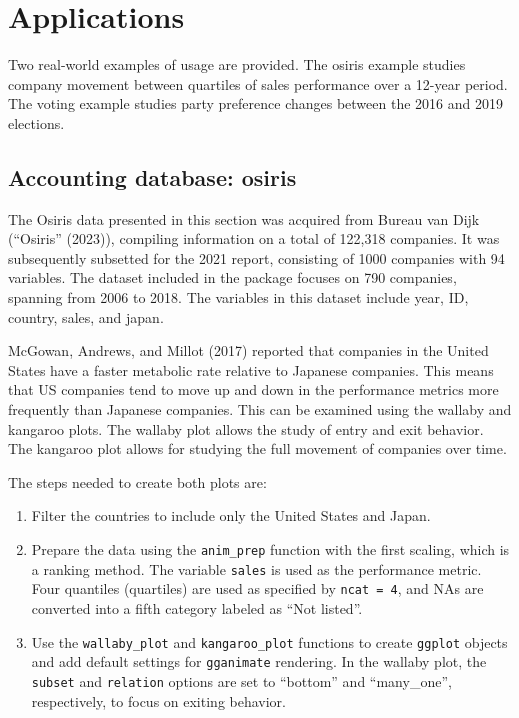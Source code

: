 \hypertarget{applications}{%
\section{Applications}\label{applications}}

Two real-world examples of usage are provided. The osiris example studies company movement between quartiles of sales performance over a 12-year period. The voting example studies party preference changes between the 2016 and 2019 elections.

\hypertarget{accounting-database-osiris}{%
\subsection{Accounting database: osiris}\label{accounting-database-osiris}}

The Osiris data presented in this section was acquired from Bureau van Dijk ({``Osiris''} (2023)), compiling information on a total of 122,318 companies. It was subsequently subsetted for the 2021 report, consisting of 1000 companies with 94 variables. The dataset included in the package focuses on 790 companies, spanning from 2006 to 2018. The variables in this dataset include year, ID, country, sales, and japan.

McGowan, Andrews, and Millot (2017) reported that companies in the United States have a faster metabolic rate relative to Japanese companies. This means that US companies tend to move up and down in the performance metrics more frequently than Japanese companies. This can be examined using the wallaby and kangaroo plots. The wallaby plot allows the study of entry and exit behavior. The kangaroo plot allows for studying the full movement of companies over time.

The steps needed to create both plots are:

\begin{enumerate}
\def\labelenumi{\arabic{enumi}.}
\tightlist
\item
  Filter the countries to include only the United States and Japan.
\item
  Prepare the data using the \texttt{anim\_prep} function with the first scaling, which is a ranking method. The variable \texttt{sales} is used as the performance metric. Four quantiles (quartiles) are used as specified by \texttt{ncat\ =\ 4}, and NAs are converted into a fifth category labeled as ``Not listed''.
\item
  Use the \texttt{wallaby\_plot} and \texttt{kangaroo\_plot} functions to create \texttt{ggplot} objects and add default settings for \texttt{gganimate} rendering. In the wallaby plot, the \texttt{subset} and \texttt{relation} options are set to ``bottom'' and ``many\_one'', respectively, to focus on exiting behavior.
\end{enumerate}


